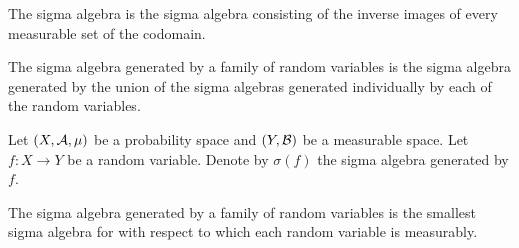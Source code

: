The sigma algebra
is the sigma algebra consisting
of the inverse images of every measurable
set of the codomain.

The sigma algebra generated
by a family of random variables
is the sigma algebra generated
by the union of the sigma algebras
generated individually by each
of the random variables.


Let $(X, \mathcal{A}, \mu)$ be a probability
space and $(Y, \mathcal{B})$ be a measurable
space.
Let $f: X \to Y$ be a random variable.
Denote by $\sigma(f)$ the
sigma algebra generated by $f$.


\begin{prop}
  The sigma algebra generated
  by a family of random variables
  is the smallest sigma algebra
  for with respect to which each
  random variable is measurably.
\end{prop}
\strats
